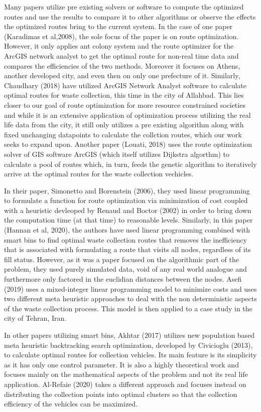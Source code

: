 \documentclass[12pt]{article}
\begin{document}
Many papers utilize pre existing solvers or software to compute the optimized routes and use the results to compare it to other algorithms or observe the effects the optimized routes bring to the current system. In the case of one paper (Karadimas et al,2008), the sole focus of the paper is on route optimization. However, it only applies ant colony system and the route optimizer for the ArcGIS network analyst to get the optimal route for non-real time data and compares the efficiencies of the two methods. Moreover it focuses on Athens, another developed city, and even then on only one prefecture of it. Similarly, Chaudhary (2018) have utilized ArcGIS Network Analyst software to calculate optimal routes for waste collection, this time in the city of Allahbad. This lies closer to our goal of route optimization for more resource constrained societies and while it is an extensive application of optimization process utilizing the real life data from the city, it still only utilizes a pre existing algorithm along with fixed unchanging datapoints to calculate the collction routes, which our work seeks to expand upon. Another paper (Louati, 2018) uses the route optimization solver of GIS software ArcGIS (which itself utilizes Dijkstra algorthm) to calculate a pool of routes which, in turn, feeds the genetic algorithm to iteratively arrive at the optimal routes for the waste collection vechicles.

In their paper, Simonetto and Borenstein (2006), they used linear programming to formulate a function for route optimization via minimization of cost coupled with a heuristic devleoped by Renaud and Boctor (2002) in order to bring down the computation time (at that time) to reasonable levels. Similarly, in this paper (Hannan et al, 2020), the authors have used linear programming combined with smart bins to find optimal waste collection routes that removes the inefficiency that is associated with formulating a route that visits all nodes, regardless of its fill status. However, as it was a paper focused on the algorithmic part of the problem, they used purely simulated data, void of any real world analogue and furthermore only factored in the euclidian distances between the nodes. Asefi (2019) uses a mixed-integer linear programming model to minimize costs and uses two different meta heuristic approaches to deal with the non deterministic aspects of the waste collection process. This model is then applied to a case study in the city of Tehran, Iran. 

In other papers utilizing smart bins, Akhtar (2017) utilizes new population based meta heuristic backtracking search optimization, developed by Civicioglu (2013), to calculate optimal routes for collection vehicles. Its main feature is its simplicity as it has only one control parameter. It is also a highly theoretical work and focuses mainly on the mathematical aspects of the problem and not its real life application. Al-Refaie (2020) takes a different approach and focuses instead on distributing the collection points into optimal clusters so that the collection efficiency of the vehicles can be maximized. 
\end{document}
